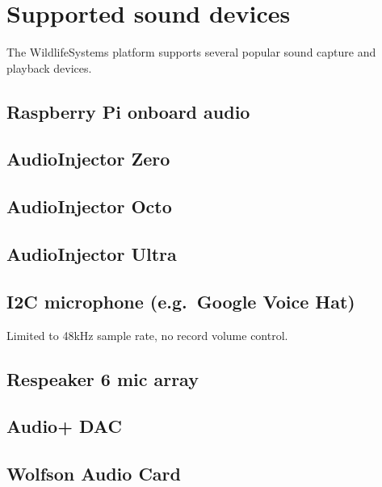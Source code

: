 \documentclass[
]{book}
\begin{document}
\section{Supported sound devices}\label{supported-sound-devices}

The WildlifeSystems platform supports several popular sound capture and playback devices.

\subsection{Raspberry Pi onboard audio}\label{raspberry-pi-onboard-audio}

\subsection{AudioInjector Zero}\label{audioinjector-zero}

\subsection{AudioInjector Octo}\label{audioinjector-octo}

\subsection{AudioInjector Ultra}\label{audioinjector-ultra}

\subsection{I2C microphone (e.g.~Google Voice Hat)}\label{i2c-microphone-e.g.-google-voice-hat}

Limited to 48kHz sample rate, no record volume control.

\subsection{Respeaker 6 mic array}\label{respeaker-6-mic-array}

\subsection{Audio+ DAC}\label{audio-dac}

\subsection{Wolfson Audio Card}\label{wolfson-audio-card}
\end{document}
